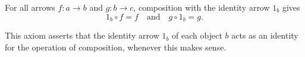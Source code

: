 For all arrows $f: a \rightarrow b$ and $g: b \rightarrow c$, composition with the identity arrow $1_b$ gives
$$1_b \circ f = f \quad \text{and} \quad g \circ 1_b = g.$$

This axiom asserts that the identity arrow $1_b$ of each object $b$ acts as an identity for the operation of composition, whenever this makes sense.
